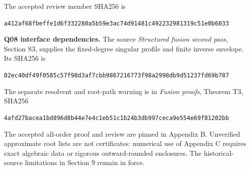 \documentclass[
  11pt,
]{article}
\begin{document}
The accepted review member SHA256 is

\nolinkurl{a412af68fbeffe1d6f332280a5b59e3ac74d91481c492232981319c51e0b6033}

\textbf{Q08 interface dependencies.} The source \emph{Structured fusion
second pass}, Section S3, supplies the fixed-degree singular profile
and finite inverse envelope. Its SHA256 is

\nolinkurl{02ec40df49f0585c57f98d3af7cbb9867216773f98a2998db9d51237fd69b787}

The separate resolvent and root-path warning is in \emph{Fusion proofs},
Theorem T3, SHA256

\nolinkurl{4afd27bacea1bd896d8b44e7e4c1eb51c1b24b3db997ceca9e554e69f81202bb}

The accepted all-order proof and review are pinned in Appendix B.
Unverified approximate root lists are not certificates: numerical use
of Appendix C requires exact algebraic data or rigorous outward-rounded
enclosures. The historical-source limitations in Section 9 remain in
force.
\end{document}
